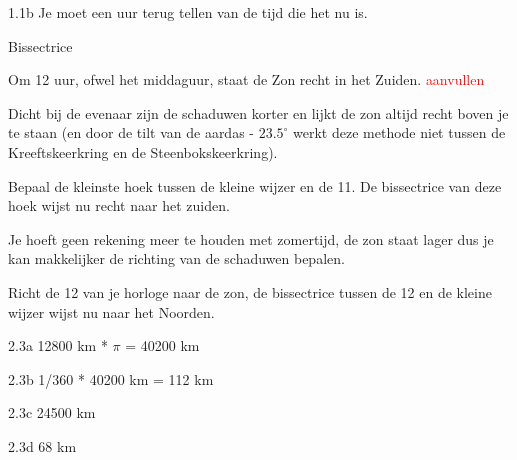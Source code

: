 \begin{Antwoord}{1.1b}
            Je moet een uur terug tellen van de tijd die het nu is.
        
\end{Antwoord}
\begin{Antwoord}{1.3}
         Bissectrice
    
\end{Antwoord}
\begin{Antwoord}{1.5}
        Om 12 uur, ofwel het middaguur, staat de Zon recht in het Zuiden. \textcolor{red}{aanvullen}
    
\end{Antwoord}
\begin{Antwoord}{1.6}
        Dicht bij de evenaar zijn de schaduwen korter en lijkt de zon altijd recht boven je te staan (en door de tilt van de aardas - $23.5^{\circ}$ werkt deze methode niet tussen de Kreeftskeerkring en de Steenbokskeerkring).
    
\end{Antwoord}
\begin{Antwoord}{1.7}
        Bepaal de kleinste hoek tussen de kleine wijzer en de 11. De bissectrice van deze hoek wijst nu recht naar het zuiden.
    
\end{Antwoord}
\begin{Antwoord}{1.8}
        Je hoeft geen rekening meer te houden met zomertijd, de zon staat lager dus je kan makkelijker de richting van de schaduwen bepalen.
    
\end{Antwoord}
\begin{Antwoord}{1.10}
        Richt de 12 van je horloge naar de zon, de bissectrice tussen de 12 en de kleine wijzer wijst nu naar het Noorden.
    
\end{Antwoord}
\begin{Antwoord}{2.3a}
			12800 km * $\pi$ = 40200 km
		
\end{Antwoord}
\begin{Antwoord}{2.3b}
			1/360 * 40200 km = 112 km
		
\end{Antwoord}
\begin{Antwoord}{2.3c}
			24500 km
		
\end{Antwoord}
\begin{Antwoord}{2.3d}
			68 km
		
\end{Antwoord}
